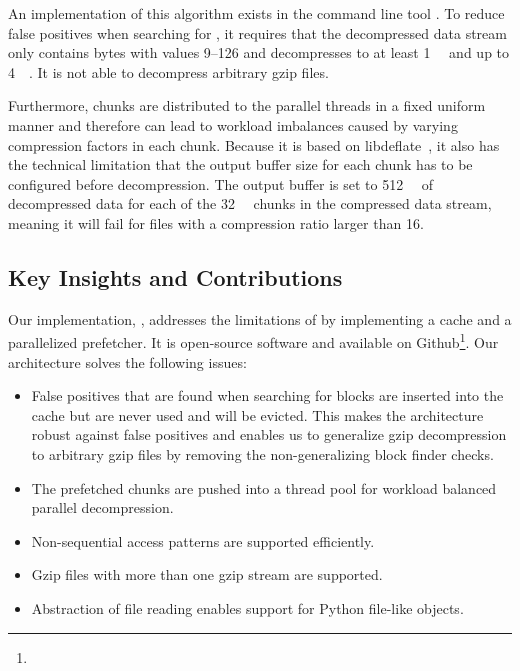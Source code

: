 An implementation of this algorithm exists in the command line tool \pugz.
To reduce false positives when searching for , it requires that the decompressed data stream only contains bytes with values 9--126 and decompresses to at least \SI{1}{\kibi\byte} and up to \SI{4}{\mebi\byte}.
It is not able to decompress arbitrary gzip files.

Furthermore, chunks are distributed to the parallel threads in a fixed uniform manner and therefore can lead to workload imbalances caused by varying compression factors in each chunk.
Because it is based on libdeflate~\cite{libdeflate}, it also has the technical limitation that the output buffer size for each chunk has to be configured before decompression.
The output buffer is set to \SI{512}{\mebi\byte} of decompressed data for each of the \SI{32}{\mebi\byte} chunks in the compressed data stream, meaning it will fail for files with a compression ratio larger than \num{16}.

\subsection{Key Insights and Contributions}


Our implementation, \pragzip{}, addresses the limitations of \pugz by implementing a cache and a parallelized prefetcher.
It is open-source software and available on Github\footnote{}.
Our architecture solves the following issues:
\begin{itemize}
    \item False positives that are found when searching for  blocks are inserted into the cache but are never used and will be evicted.
          This makes the architecture robust against false positives and enables us to generalize gzip decompression to arbitrary gzip files by removing the non-generalizing  block finder checks.
    \item The prefetched chunks are pushed into a thread pool for workload balanced parallel decompression.
    \item Non-sequential access patterns are supported efficiently.
    \item Gzip files with more than one gzip stream are supported.
    \item Abstraction of file reading enables support for Python file-like objects.
\end{itemize}


